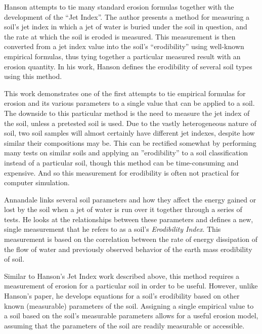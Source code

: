 
Hanson \cite{Hanson-JetIndex} attempts to tie many standard erosion formulas together with the development of the ``Jet Index''. The author presents a method for measuring a soil's jet index in which a jet of water is buried under the soil in question, and the rate at which the soil is eroded is measured.
This measurement is then converted from a jet index value into the soil's ``erodibility'' using well-known empirical formulas, thus tying together a particular measured result with an erosion quantity. In his work, Hanson defines the erodibility of several soil types using this method.

This work demonstrates one of the first attempts to tie empirical formulas for erosion and its various parameters to a single value that can be applied to a soil. The downside to this particular method is the need to measure the jet index of the soil, unless a pretested soil is used. Due to the vastly heterogeneous nature of soil, two soil samples will almost certainly have different jet indexes, despite how similar their compositions may be. This can be rectified somewhat by performing many tests on similar soils and applying an ''erodibility'' to a soil classification instead of a particular soil, though this method can be time-consuming and expensive. And so this measurement for erodibility is often not practical for computer simulation.

Annandale \cite{Annandale-Erodibility} links several soil parameters and how they affect the energy gained or lost by the soil when a jet of water is run over it together through a series of tests. He looks at the relationships between these parameters and defines a new, single measurement that he refers to as a soil's \emph{Erodibility Index}.  This measurement is based on the correlation between the rate of energy dissipation of the flow of water and previously observed behavior of the earth mass erodibility of soil.

Similar to Hanson's Jet Index work described above, this method requires a measurement of erosion for a particular soil in order to be useful. However, unlike Hanson's paper, he develops equations for a soil's erodibility based on other known (measurable) parameters of the soil. Assigning a single empirical value to a soil based on the soil's measurable parameters allows for a useful erosion model, assuming that the parameters of the soil are readily measurable or accessible.

